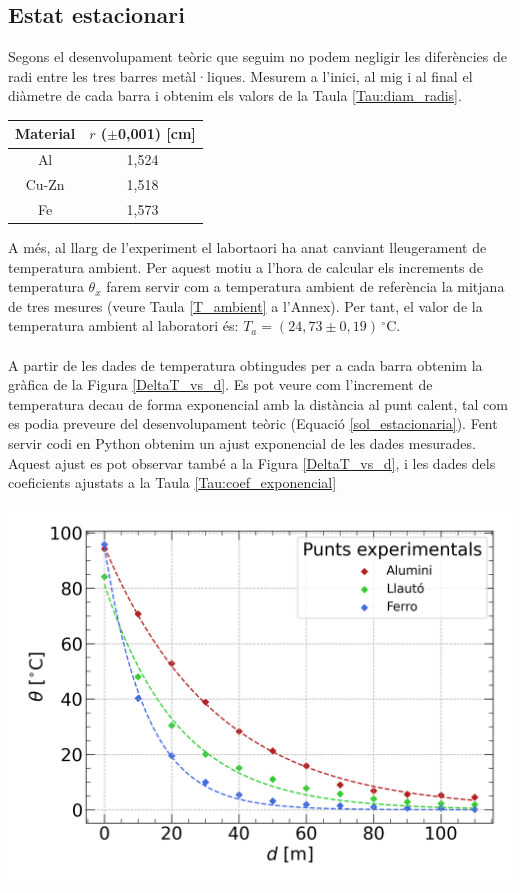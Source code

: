 \documentclass[12pt,twosides,onecolumn,openany]{article}
\newenvironment{Figura}
  {\par\medskip\noindent\minipage{\linewidth}}
  {\endminipage\par\medskip}
\begin{document}
\begin{multicols}{2}
\subsection{Estat estacionari}
Segons el desenvolupament teòric que seguim no podem negligir les diferències de radi entre les tres barres metàl·liques. Mesurem a l'inici, al mig i al final el diàmetre de cada barra i obtenim els valors de la Taula \ref{Tau:diam_radis}.
\begin{Figura}
  \centering
  \begin{tabular}{c|c}
    Material & $r$ ($\pm$0,001) [cm] \\
    \hline\hline
    Al & 1,524\\
    Cu-Zn & 1,518\\
    Fe & 1,573 
  \end{tabular}
  \label{Tau:diam_radis}
\end{Figura}
A més, al llarg de l'experiment el labortaori ha anat canviant lleugerament de temperatura ambient. Per aquest motiu a l'hora de calcular els increments de temperatura $\theta_x$ farem servir com a temperatura ambient de referència la mitjana de tres mesures (veure Taula \ref{T_ambient} a l'Annex). Per tant, el valor de la temperatura ambient al laboratori és: \(T_a = (24,73 \pm 0,19)\,^\circ\text{C}\).\\\\
A partir de les dades de temperatura obtingudes per a cada barra obtenim la gràfica de la Figura \ref{DeltaT_vs_d}. Es pot veure com l'increment de temperatura decau de forma exponencial amb la distància al punt calent, tal com es podia preveure del desenvolupament teòric (Equació \eqref{sol_estacionaria}). Fent servir codi en Python obtenim un ajust exponencial de les dades mesurades. Aquest ajust es pot observar també a la Figura \ref{DeltaT_vs_d}, i les dades dels coeficients ajustats a la Taula \ref{Tau:coef_exponencial}
\begin{Figura}
  \centering
  \includegraphics[width = 1\linewidth]{../../graphs/practica_Ia/plots/theta_vs_d_estacionaria.png}\label{DeltaT_vs_d}

\end{Figura}
\end{multicols}
\end{document}
